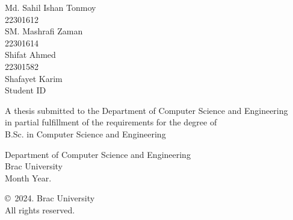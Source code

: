 \begin{titlepage}
\renewcommand*{\thepage}{Title} %

    \begin{center} 
        \vspace*{3cm} %
        
        {\fontsize{16pt}{22pt}\selectfont{Final Year Thesis/Project Report Template}
        } %
        
        \vspace{1.5cm}
        
        
        \vspace{0.5cm}
        
        	Md. Sahil Ishan Tonmoy\\
	        22301612\\
	        SM. Mashrafi Zaman\\
	        22301614\\
	        Shifat Ahmed\\
	        22301582\\
	        Shafayet Karim\\
	        Student ID

        \vspace{1.5cm}
        
        	A thesis submitted to the Department of Computer Science and Engineering\\
            in partial fulfillment of the requirements for the degree of\\
            B.Sc. in Computer Science and Engineering

        
        \vspace{2.5cm}
        
    		Department of Computer Science and Engineering\\
            Brac University\\
            Month Year.
        
        \vspace{3cm}
        
    		\copyright\ 2024. Brac University\\
            All rights reserved.
    
    \end{center}

\end{titlepage}
